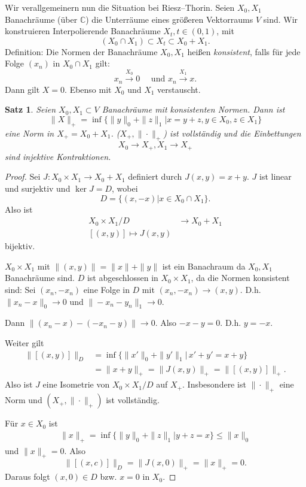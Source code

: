 \documentclass[
paper=a4,
bibtotocnumbered,
liststotocnumbered,
tablecaptionabove,
pointlessnumbers,
twoside,
openright,
10pt
]
{report}
\newtheorem{satz}[thm]{Satz}
\theoremstyle{definition}
\numberwithin{equation}{chapter}
\begin{document}
Wir verallgemeinern nun die Situation bei Riesz--Thorin. Seien $X_0, X_1$ Banachräume (über $\mathbb C$) die Unterräume eines größeren Vektorraums $V$ sind. Wir konstruieren Interpolierende Banachräume $X_t,  t\in (0,1)$, mit 
$$(X_0 \cap X_1)\subset X_t \subset X_0 + X_1.$$
Definition:  Die Normen der Banachräume $X_0, X_1$ heißen \emph{konsistent}, falls für jede Folge $(x_n)$ in $X_0 \cap X_1$ gilt:
\begin{equation}
x_n \stackrel{X_0}\to 0 \quad \text{ und } x_n \stackrel{X_1}\to x.
\end{equation}
Dann gilt $X=0$. Ebenso mit $X_0$ und $X_1$ verstauscht.  

\begin{satz}\label{4.10}
Seien $X_0, X_1\subset V$ Banachräume mit konsistenten Normen. Dann ist 
$$\| X\|_+ = \inf\{ \| y \|_0 + \|z\|_1| x=y+z, y\in X_0, z\in X_1\}$$
eine Norm in $X_+ = X_0 + X_1$. ($X_+, \| \cdot \|_+$) ist vollständig und die Einbettungen $$X_0\to X_+, X_1 \to X_+$$
sind injektive Kontraktionen.
\end{satz}
\begin{proof}
Sei $J: X_0 \times X_1 \to X_0 + X_1$ definiert durch $J(x,y) = x+y$. $J$ ist linear und surjektiv und $\ker J=D$, wobei
\begin{equation}
D= \{(x,-x) | x\in X_0 \cap X_1\}.
\end{equation}
Also ist
\begin{align*}
X_0 \times X_1 /D &\to X_0 + X_1\\
[(x,y)] \mapsto J(x,y)
\end{align*}
bijektiv.

$X_0 \times X_1$ mit $\| (x,y) \| = \| x\| + \|y\|$ ist ein Banachraum da $X_0, X_1$ Banachräume sind. $D$ ist abgeschlossen in $X_0\times X_1$, da die Normen konsistent sind: Sei $(x_n, -x_n)$ eine Folge in $D$ mit $(x_n, -x_n) \to (x,y)$. D.h. $\| x_n - x\|_0 \to 0$ und $\|-x_n-y_n\|_1 \to 0$.

Dann $\| (x_n -x) - (-x_n-y) \| \to 0$. Also $-x-y =0$. D.h. $y=-x$.

Weiter gilt
\begin{align*}
\| [(x,y)] \|_D &= \inf \{ \| x'\|_0 + \| y'\|_1|\, x' + y' = x+y\}\\ 
&= \| x+y\|_+ = \| J(x,y)\|_+ = \| [(x,y)]\|_+.
\end{align*}
Also ist $J$ eine Isometrie von $X_0 \times X_1/D$ auf $X_+$. Insbesondere ist $\| \cdot \|_+$ eine Norm und $(X_+, \|\cdot \|_+)$ ist vollständig.

Für $x\in X_0$ ist
\begin{align*}
\| x\|_+ = \inf\{ \| y\|_0 + \| z\|_1 | y+z=x\}\le \|x\|_0
\end{align*}
und $\| x\|_+ =0$. Also 
$$\| [(x,c)]\|_D= \| J(x,0)\|_+ = \| x\|_+ =0.$$
Daraus folgt $(x,0)\in D$ bzw. $x=0$ in $X_0$.
\end{proof}
\end{document}
